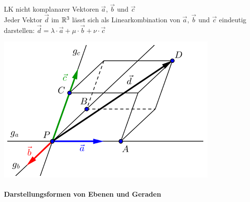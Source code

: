 \begin{minipage}{0.7\linewidth}
    \begin{theorem}{LK nicht komplanarer Vektoren} $\vec{a}$, $\vec{b}$ und $\vec{c}$\\
        Jeder Vektor $\vec{d}$ im $\mathbb{R}^3$ lässt sich als Linearkombination von $\vec{a}$, $\vec{b}$ und $\vec{c}$ eindeutig darstellen:
            {\large$\vec{d}=\lambda\cdot\vec{a}+\mu\cdot\vec{b}+\nu\cdot\vec{c}$}
    \end{theorem}
    \end{minipage}
    \begin{minipage}{0.25\linewidth}
        \includegraphics[width=\linewidth]{vec-nicht-kompl.png}
\end{minipage}

\paragraph{Darstellungsformen von Ebenen und Geraden}


